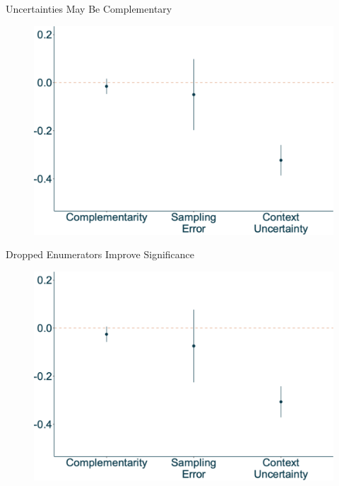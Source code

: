 \documentclass[
  ignorenonframetext,
]{beamer}
\begin{document}
\begin{frame}{Uncertainties May Be Complementary}
\protect\hypertarget{uncertainties-may-be-complementary}{}
\begin{figure}

{\centering \includegraphics{presentation2_files/figure-beamer/unnamed-chunk-5-1.svg}

}

\end{figure}

\begin{block}{Dropped Enumerators Improve Significance}
\protect\hypertarget{dropped-enumerators-improve-significance}{}
\begin{figure}

{\centering \includegraphics{presentation2_files/figure-beamer/unnamed-chunk-6-1.svg}

}

\end{figure}
\end{block}
\end{frame}
\end{document}
